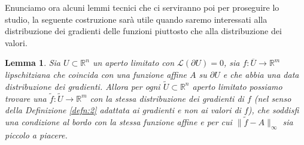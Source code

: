 \documentclass[a4paper,11pt]{book}
\theoremstyle{plain}
\newtheorem{lemma}[teo]{Lemma}
\theoremstyle{definition}
\theoremstyle{remark}
\newcommand{\R}{\mathbb{R}}
\newcommand{\LL}{\mathscr{L}}
\newcommand{\norm}[1]{\lVert#1\rVert}
\begin{document}
Enunciamo ora alcuni lemmi tecnici che ci serviranno poi per proseguire lo studio, la seguente costruzione sarà utile quando saremo interessati alla distribuzione dei gradienti delle funzioni piuttosto che alla distribuzione dei valori.
\begin{lemma}\label{costr:1}
	Sia $U\subset \R^{n}$ un aperto limitato con $\LL(\partial U)=0$, sia $f:\overline{U}\to\R^{m}$ lipschitziana che coincida con una funzione affine $A$ su $\partial U$ e che abbia una data distribuzione dei gradienti. Allora per ogni $\widetilde{U}\subset \R^{n}$ aperto limitato possiamo trovare una $\widetilde{f}:\widetilde{U}\to\R^{m}$ con la stessa distribuzione dei gradienti di $f$ (nel senso della Definizione \ref{defn:2} adattata ai gradienti e non ai valori di $f$), che soddisfi una condizione al bordo con la stessa funzione affine e per cui $\norm{\widetilde{f}-A}_{\infty}$ sia piccolo a piacere.
\end{lemma}
\end{document}
